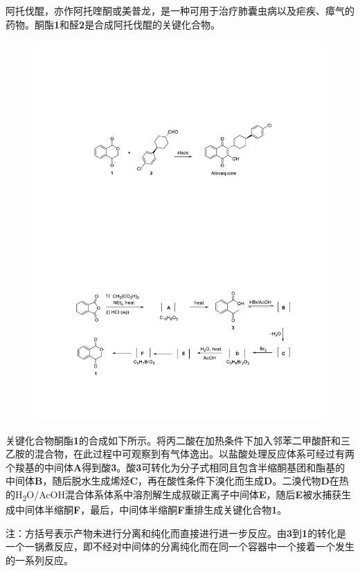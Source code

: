 阿托伐醌，亦作阿托喹酮或美普龙，是一种可用于治疗肺囊虫病以及疟疾、瘴气的药物。酮酯\textbf{1}和醛\textbf{2}是合成阿托伐醌的关键化合物。

\begin{figure}[h]
	\centering
	\includegraphics[width=14cm]{./pic/t6-1.pdf}
\end{figure}

关键化合物酮酯\textbf{1}的合成如下所示。将丙二酸在加热条件下加入邻苯二甲酸酐和三乙胺的混合物，在此过程中可观察到有气体逸出。以盐酸处理反应体系可经过有两个羧基的中间体\textbf{A}得到酸\textbf{3}。酸\textbf{3}可转化为分子式相同且包含半缩酮基团和酯基的中间体\textbf{B}，随后脱水生成烯烃\textbf{C}，再在酸性条件下溴化而生成\textbf{D}。二溴代物\textbf{D}在热的H\textsubscript{2}O/AcOH混合体系体系中溶剂解生成叔碳正离子中间体\textbf{E}，随后\textbf{E}被水捕获生成中间体半缩酮\textbf{F}，最后，中间体半缩酮\textbf{F}重排生成关键化合物\textbf{1}。

\noindent 注：方括号表示产物未进行分离和纯化而直接进行进一步反应。由\textbf{3}到\textbf{1}的转化是一个一锅煮反应，即不经对中间体的分离纯化而在同一个容器中一个接着一个发生的一系列反应。

